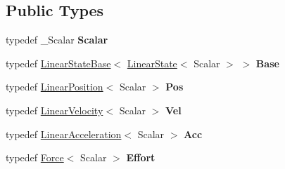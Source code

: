 \subsection*{Public Types}
\begin{DoxyCompactItemize}
\item 
typedef \+\_\+\+Scalar {\bfseries Scalar}\hypertarget{classow__core_1_1LinearState_a46bf5ce9b8805eada92187897d4e25e1}{}\label{classow__core_1_1LinearState_a46bf5ce9b8805eada92187897d4e25e1}

\item 
typedef \hyperlink{classow__core_1_1LinearStateBase}{Linear\+State\+Base}$<$ \hyperlink{classow__core_1_1LinearState}{Linear\+State}$<$ Scalar $>$ $>$ {\bfseries Base}\hypertarget{classow__core_1_1LinearState_a797d8badfeb3a75e7147f8f002e18b03}{}\label{classow__core_1_1LinearState_a797d8badfeb3a75e7147f8f002e18b03}

\item 
typedef \hyperlink{classow__core_1_1LinearPosition}{Linear\+Position}$<$ Scalar $>$ {\bfseries Pos}\hypertarget{classow__core_1_1LinearState_aea84e2d7b5498687c6b37fdcd425c4e2}{}\label{classow__core_1_1LinearState_aea84e2d7b5498687c6b37fdcd425c4e2}

\item 
typedef \hyperlink{classow__core_1_1LinearVelocity}{Linear\+Velocity}$<$ Scalar $>$ {\bfseries Vel}\hypertarget{classow__core_1_1LinearState_a3a78d4ea0ddae2e5c6747f55e0569c38}{}\label{classow__core_1_1LinearState_a3a78d4ea0ddae2e5c6747f55e0569c38}

\item 
typedef \hyperlink{classow__core_1_1LinearAcceleration}{Linear\+Acceleration}$<$ Scalar $>$ {\bfseries Acc}\hypertarget{classow__core_1_1LinearState_a7f0fb820b0e27417a61fc4682f1e0c74}{}\label{classow__core_1_1LinearState_a7f0fb820b0e27417a61fc4682f1e0c74}

\item 
typedef \hyperlink{classow__core_1_1Force}{Force}$<$ Scalar $>$ {\bfseries Effort}\hypertarget{classow__core_1_1LinearState_a37f916679432fa6bad8c202d5b81d968}{}\label{classow__core_1_1LinearState_a37f916679432fa6bad8c202d5b81d968}

\end{DoxyCompactItemize}
